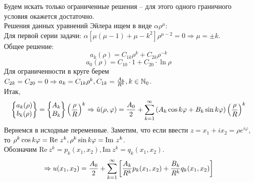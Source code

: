 Будем искать только ограниченные решения -- для этого одного граничного условия окажется достаточно.\\
Решения данных уравнений Эйлера ищем в виде $\alpha \rho^\mu$:\\
Для первой серии задачи: $\alpha[\mu(\mu-1)+\mu - k^2] \rho^{\mu-2} = 0 \Rightarrow \mu = \pm k$.\\
Общее решение:
$$ a_k(\rho) = C_{1k}\rho^k+C_{2k}\rho^{-k} $$
$$a_0(\rho) = C_{10} \cdot 1 + C_{20} \cdot \ln \rho$$
Для ограниченности в круге берем $C_{2k} = C_{20} = 0 \Rightarrow a_k = C_{1k} \rho^k, C_{1k} = \frac{A_k}{R^k}, k \in \mathbb{N}_0$.\\
Итак, 
\begin{equation}\label{16_2}
\left\{\begin{matrix} a_k(\rho)\\ b_k(\rho) \end{matrix}\right\} = \left\{\begin{matrix} A_k\\ B_k \end{matrix}\right\}\left(\frac{\rho}{R}\right)^k \Rightarrow \hat u(\rho, \varphi) = \frac{A_0}{2} + \sum_{k=1}^{\infty}\left(A_k \cos k \varphi + B_k \sin k \varphi\right) \left(\frac{\rho}{R}\right)^k  
\end{equation}
Вернемся в исходные переменные. Заметим, что если ввести $z = x_1+ix_2 = \rho e^{i \varphi}$, то $\rho^k \cos k \varphi = \mathrm{Re} \ z^k,\\ \rho^k \sin k \varphi = \mathrm{Im} \ z^k$.\\ Обозначим $\mathrm{Re} \ z^k = p_k(x_1,x_2), \mathrm{Im} \ z^k = q_k(x_1,x_2)$.
\begin{equation} \label{16_3}
\Rightarrow u(x_1,x_2) = \frac{A_0}{2}+ \sum_{k=1}^{\infty}\left[\frac{A_k}{R^k} p_k(x_1,x_2) + \frac{B_k}{R^k} q_k(x_1,x_2)\right] 
\end{equation}
